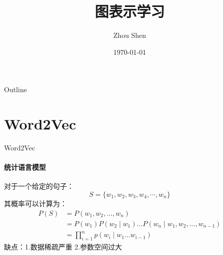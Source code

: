 \documentclass{beamer}
\title[Graph Embedding]{图表示学习}
\author[S. Zhou]{Zhou Shen}
\institute{School of Computer Science, Wuhan University}
\date{\today}
\begin{document}
\begin{frame}
    \titlepage
\end{frame}
\begin{frame}{Outline}
    \tableofcontents
\end{frame}
\section{Word2Vec}
\begin{frame}{Word2Vec}
    \framesubtitle{统计语言模型}
    对于一个给定的句子：
    $$S=\{w_1, w_2, w_3, w_4, \cdots, w_n\}$$
    其概率可以计算为：
    $$
        \begin{aligned}
            P(S)&=P\left(w_{1}, w_{2}, \ldots, w_{n}\right) \\
            &=P\left(w_{1}\right) P\left(w_{2} \mid w_{1}\right) \ldots P\left(w_{n} \mid w_{1}, w_{2}, \ldots, w_{n-1}\right) \\
            &=\prod_{i=1}^{n} p\left(w_{i} \mid w_{1} \ldots w_{i-1}\right)
        \end{aligned}
    $$
    缺点：1.数据稀疏严重 2.参数空间过大
\end{frame}
\end{document}
